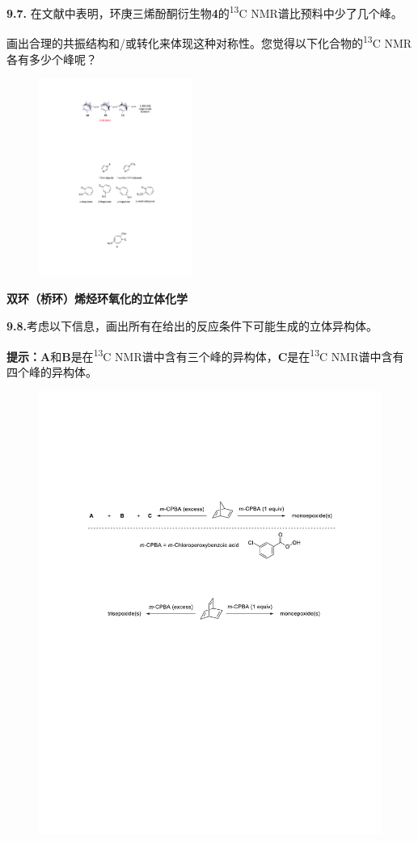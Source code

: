 \newpage\noindent\textbf{9.7.}
在文献中表明，环庚三烯酚酮衍生物\textbf{4}的\textsuperscript{13}C NMR谱比预料中少了几个峰。

画出合理的共振结构和/或转化来体现这种对称性。您觉得以下化合物的\textsuperscript{13}C NMR各有多少个峰呢？

\begin{figure}[h]
	\centering
	\includegraphics[width=5cm]{./pic/t9-4.pdf}
\end{figure}

\noindent\textbf{双环（桥环）烯烃环氧化的立体化学}

\noindent\textbf{9.8.}考虑以下信息，画出所有在给出的反应条件下可能生成的立体异构体。

\noindent\textbf{提示：A}和\textbf{B}是在\textsuperscript{13}C NMR谱中含有三个峰的异构体，\textbf{C}是在\textsuperscript{13}C NMR谱中含有四个峰的异构体。

\begin{figure}[h]
	\centering
	\includegraphics[width=14cm]{./pic/t9-5.pdf}
\end{figure}


